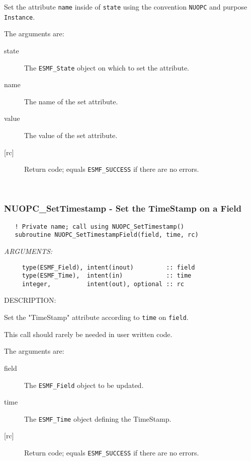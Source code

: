      Set the attribute {\tt name} inside of {\tt state} using the
     convention {\tt NUOPC} and purpose {\tt Instance}.
  
     The arguments are:
     \begin{description}
     \item[state]
       The {\tt ESMF\_State} object on which to set the attribute.
     \item[name]
       The name of the set attribute.
     \item[value]
       The value of the set attribute.
     \item[{[rc]}]
       Return code; equals {\tt ESMF\_SUCCESS} if there are no errors.
     \end{description}
   
 
\mbox{}\hrulefill\ 
 
\subsubsection [NUOPC\_SetTimestamp] {NUOPC\_SetTimestamp - Set the TimeStamp on a Field}


\begin{verbatim}   ! Private name; call using NUOPC_SetTimestamp()
   subroutine NUOPC_SetTimestampField(field, time, rc)\end{verbatim}{\em ARGUMENTS:}
\begin{verbatim}     type(ESMF_Field), intent(inout)         :: field
     type(ESMF_Time),  intent(in)            :: time
     integer,          intent(out), optional :: rc\end{verbatim}
{\sf DESCRIPTION:\\ }


     Set the "TimeStamp" attribute according to {\tt time} on {\tt field}.
  
     This call should rarely be needed in user written code.
  
     The arguments are:
     \begin{description}
     \item[field]
       The {\tt ESMF\_Field} object to be updated.
     \item[time]
       The {\tt ESMF\_Time} object defining the TimeStamp.
     \item[{[rc]}]
       Return code; equals {\tt ESMF\_SUCCESS} if there are no errors.
     \end{description}
   
